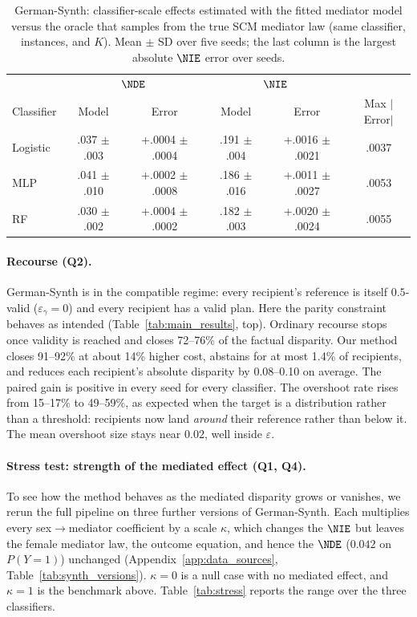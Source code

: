 \begin{table}[t]
\centering
\small
\caption{German-Synth: classifier-scale effects estimated with the fitted
mediator model versus the oracle that samples from the true SCM mediator law
(same classifier, instances, and $K$). Mean $\pm$ SD over five seeds; the
last column is the largest absolute $\NIE$ error over seeds.}
\label{tab:oracle}
\begin{tabular}{lccccc}
\hline
& \multicolumn{2}{c}{$\NDE$} & \multicolumn{2}{c}{$\NIE$} & \\
Classifier & Model & Error & Model & Error & Max $|$Error$|$ \\
\hline
Logistic & .037 $\pm$ .003 & +.0004 $\pm$ .0004 & .191 $\pm$ .004 & +.0016 $\pm$ .0021 & .0037 \\
MLP      & .041 $\pm$ .010 & +.0002 $\pm$ .0008 & .186 $\pm$ .016 & +.0011 $\pm$ .0027 & .0053 \\
RF       & .030 $\pm$ .002 & +.0004 $\pm$ .0002 & .182 $\pm$ .003 & +.0020 $\pm$ .0024 & .0055 \\
\hline
\end{tabular}
\end{table}

\paragraph{Recourse (Q2).}
German-Synth is in the compatible regime: every recipient's reference is
itself $0.5$-valid ($\varepsilon_\gamma=0$) and every recipient has a valid
plan. Here the parity constraint behaves as intended
(Table~\ref{tab:main_results}, top). Ordinary recourse stops once validity
is reached and closes 72--76\% of the factual disparity. Our method closes
91--92\% at about 14\% higher cost, abstains for at most 1.4\% of recipients,
and reduces each recipient's absolute disparity by 0.08--0.10 on average. The
paired gain is positive in every seed for every classifier. The overshoot rate
rises from 15--17\% to 49--59\%, as expected when the target is a
distribution rather than a threshold: recipients now land \emph{around} their
reference rather than below it. The mean overshoot size stays near
$0.02$, well inside $\varepsilon$.

\paragraph{Stress test: strength of the mediated effect (Q1, Q4).}
To see how the method behaves as the mediated disparity grows or vanishes,
we rerun the full pipeline on three further versions of German-Synth. Each
multiplies every sex$\to$mediator coefficient by a scale $\kappa$, which
changes the $\NIE$ but leaves the female mediator law, the outcome equation,
and hence the $\NDE$ ($0.042$ on $P(Y=1)$) unchanged
(Appendix~\ref{app:data_sources}, Table~\ref{tab:synth_versions}).
$\kappa=0$ is a null case with no mediated effect, and $\kappa=1$ is the
benchmark above. Table~\ref{tab:stress} reports the range over the three
classifiers.


